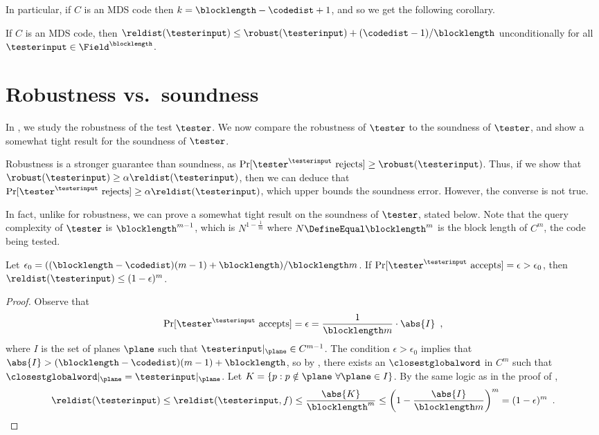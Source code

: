\documentclass{toc}
\theoremstyle{plain}
\begin{document}
In particular, if $C$ is an MDS code then $k = \blocklength - \codedist + 1$, and so we get the following corollary.

\begin{corollary}
\label{cor:robustness-of-RS}
If $C$ is an MDS code, then $\reldist(\testerinput) \leq \robust(\testerinput) +  (\codedist-1)/\blocklength$ unconditionally for all $\testerinput \in \Field^{\blocklength}$.
\end{corollary}


%
%
%
\section{Robustness vs.\ soundness}
\label{sec:soundness}

In , we study the robustness of the test $\tester$. We now compare the robustness of $\tester$ to the soundness of $\tester$, and show a somewhat tight result for the soundness of $\tester$.

Robustness is a stronger guarantee than soundness, as $\Pr[\tester^{\testerinput} \text{ rejects}] \geq \robust(\testerinput)$. Thus, if we show that $\robust(\testerinput) \geq \alpha \reldist(\testerinput)$, then we can deduce that $\Pr[\tester^{\testerinput}\text{ rejects}] \geq \alpha \reldist(\testerinput)$, which upper bounds the soundness error. However, the converse is not true.

In fact, unlike for robustness, we can prove a somewhat tight result on the soundness of $\tester$, stated below. Note that the query complexity of $\tester$ is $\blocklength^{m-1}$, which is $N^{1 - \frac{1}{m}}$ where $N \DefineEqual \blocklength^m$ is the block length of $C^{m}$, the code being tested.

%

\begin{claim}
\label{claim:accprob}
Let $\epsilon_0 = ((\blocklength - \codedist)(m-1) + \blocklength )/\blocklength m$. If $\Pr[\tester^{\testerinput} \text{ accepts}] = \epsilon > \epsilon_0$, then $\reldist(\testerinput) \leq (1 - \epsilon)^m$.
\end{claim}
\begin{proof}
  Observe that
  \[
    \Pr[\tester^{\testerinput} \text{ accepts}] = \epsilon = \frac{1}{\blocklength m} \cdot \abs{I}\enspace,
  \]
  where $I$ is the set of planes $\plane$ such that $\testerinput \vert_{\plane} \in C^{m-1}$. The condition $\epsilon > \epsilon_0$ implies that $\abs{I} > (\blocklength - \codedist)(m-1) + \blocklength$, so by , there exists an $\closestglobalword$ in $C^m$ such that $\closestglobalword \vert_{\plane} = \testerinput \vert_{\plane}$. Let $K = \{p : p \notin \plane \ \forall \plane \in I\}$. By the same logic as in the proof of ,
\begin{equation*}
\reldist(\testerinput) \leq \reldist(\testerinput, f) \leq \frac{\abs{K}}{\blocklength^m} \leq \left(1 - \frac{\abs{I}}{\blocklength m} \right)^m = (1 - \epsilon)^m \enspace. \qedhere
\end{equation*}
\end{proof}
\end{document}
